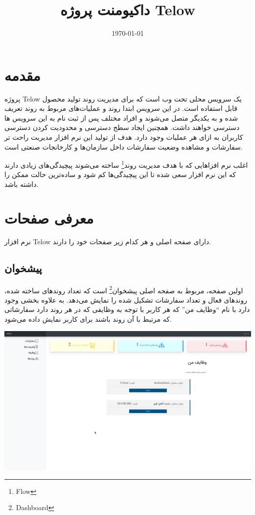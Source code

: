 \documentclass[a4paper]{article}
\author{\rl{مهدی صفریان}}
\date{\today}
\title{داکیومنت پروژه Telow}
\begin{document}
\maketitle
\tableofcontents




\section{مقدمه}
\label{sec:orgc0afcf0}

پروژه Telow یک سرویس محلی تحت وب است که برای مدیریت روند تولید محصول قابل استفاده است.
در این سرویس ابتدا روند و عملیات‌های مربوط به روند تعریف شده و به یکدیگر متصل می‌شوند و افراد مختلف پس از ثبت نام به این سرویس ها دسترسی خواهند داشت.
همچنین ایجاد سطح دسترسی و محدودیت کردن دسترسی کاربران به ازای هر عملیات وجود دارد.
هدف از تولید این نرم افزار مدیریت راحت تر سفارشات و مشاهده وضعیت سفارشات داخل سازمان‌ها و کارخانجات صنعتی است.

اغلب نرم افزاهایی که با هدف مدیریت روند\footnote{Flow} ساخته می‌شوند پیچیدگی‌های زیادی دارند که این نرم افزار سعی شده تا این پیچیدگی‌ها کم شود و ساده‌ترین حالت ممکن
را داشته باشد.

\section{معرفی صفحات}
\label{sec:orgafb0808}
نرم افزار Telow دارای صفحه اصلی و هر کدام زیر صفحات خود را دارند.

\subsection{پیشخوان}
\label{sec:org02bdd8d}
اولین صفحه، مربوط به صفحه اصلی پیشخوان\footnote{Dashboard} است که تعداد روند‌های ساخته شده، روندهای فعال و
تعداد سفارشات تشکیل شده را نمایش می‌دهد. به علاوه بخشی وجود دارد با نام ``وظایف من'' که هر کاربر با توجه به وظایفی که
در هر روند دارد سفارشاتی که مرتبط با آن روند باشند برای کاربر نمایش داده می‌شود.

\begin{center}
\includegraphics[width=.9\linewidth]{./img/dashboard.png}
\end{center}
\end{document}
